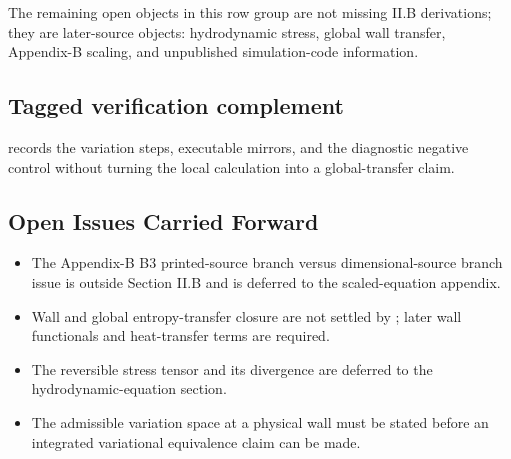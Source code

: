 The remaining open objects in this row group are not missing II.B derivations;
they are later-source objects: hydrodynamic stress, global wall transfer,
Appendix-B scaling, and unpublished simulation-code information.

\subsection*{Tagged verification complement}

 records the
variation steps, executable mirrors, and the diagnostic negative control without
turning the local calculation into a global-transfer claim.

\subsection{Open Issues Carried Forward}

\begin{itemize}
\item The Appendix-B B3 printed-source branch versus dimensional-source branch
  issue is outside Section II.B and is deferred to the scaled-equation
  appendix.
\item Wall and global entropy-transfer closure are not settled by
  ; later wall functionals and heat-transfer terms are required.
\item The reversible stress tensor and its divergence are deferred to the
  hydrodynamic-equation section.
\item The admissible variation space at a physical wall must be stated before
  an integrated variational equivalence claim can be made.
\end{itemize}
